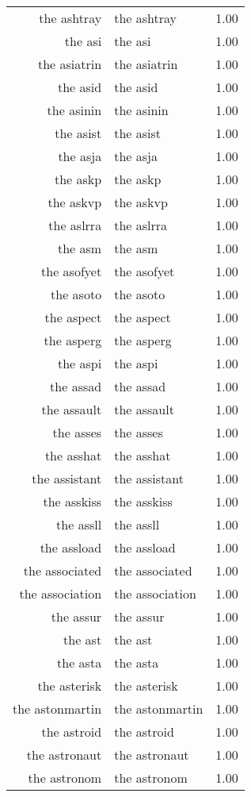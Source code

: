 \begin{table}[ht]
\begin{tabular}{rlr}
  the ashtray & the ashtray & 1.00 \\ 
  the asi & the asi & 1.00 \\ 
  the asiatrin & the asiatrin & 1.00 \\ 
  the asid & the asid & 1.00 \\ 
  the asinin & the asinin & 1.00 \\ 
  the asist & the asist & 1.00 \\ 
  the asja & the asja & 1.00 \\ 
  the askp & the askp & 1.00 \\ 
  the askvp & the askvp & 1.00 \\ 
  the aslrra & the aslrra & 1.00 \\ 
  the asm & the asm & 1.00 \\ 
  the asofyet & the asofyet & 1.00 \\ 
  the asoto & the asoto & 1.00 \\ 
  the aspect & the aspect & 1.00 \\ 
  the asperg & the asperg & 1.00 \\ 
  the aspi & the aspi & 1.00 \\ 
  the assad & the assad & 1.00 \\ 
  the assault & the assault & 1.00 \\ 
  the asses & the asses & 1.00 \\ 
  the asshat & the asshat & 1.00 \\ 
  the assistant & the assistant & 1.00 \\ 
  the asskiss & the asskiss & 1.00 \\ 
  the assll & the assll & 1.00 \\ 
  the assload & the assload & 1.00 \\ 
  the associated & the associated & 1.00 \\ 
  the association & the association & 1.00 \\ 
  the assur & the assur & 1.00 \\ 
  the ast & the ast & 1.00 \\ 
  the asta & the asta & 1.00 \\ 
  the asterisk & the asterisk & 1.00 \\ 
  the astonmartin & the astonmartin & 1.00 \\ 
  the astroid & the astroid & 1.00 \\ 
  the astronaut & the astronaut & 1.00 \\ 
  the astronom & the astronom & 1.00 \\ 

\end{tabular}
\end{table}
